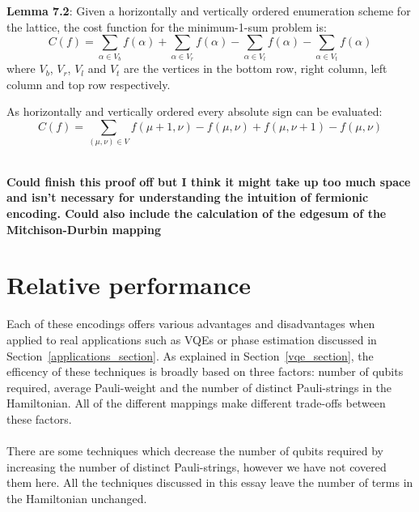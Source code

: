 \documentclass[twoside]{article}
\begin{document}
\begin{itemlist}
\begin{alphlist}
               \end{alphlist}
       \item \textbf{Lemma 7.2}: Given a horizontally and vertically ordered enumeration scheme for the lattice, the cost function for the minimum-1-sum problem is:
               \begin{equation}
                       C(f) = \sum_{\alpha\in V_b} f(\alpha) + \sum_{\alpha\in V_r} f(\alpha) - \sum_{\alpha\in V_l} f(\alpha) - \sum_{\alpha\in V_t} f(\alpha) 
               \end{equation}
               where $V_b$, $V_r$, $V_l$ and $V_t$ are the vertices in the bottom row, right column, left column and top row respectively.
               \begin{alphlist}
               \item As horizontally and vertically ordered every absolute sign can be evaluated:
                       \begin{equation}
                               C(f) = \sum_{(\mu, \nu) \in V} f(\mu+1, \nu) - f(\mu, \nu) + f(\mu, \nu+1) - f(\mu, \nu)
                       \end{equation}\\
               \end{alphlist}
               \end{itemlist}
               \textbf{Could finish this proof off but I think it might take up too much space and isn't necessary for understanding the intuition of fermionic encoding. Could also include the calculation of the edgesum of the Mitchison-Durbin mapping}
   \section{Relative performance}\label{comparision_section}
   Each of these encodings offers various advantages and disadvantages when applied to real applications such as VQEs or phase estimation discussed in Section~\ref{applications_section}. As explained in Section~\ref{vqe_section}, the efficency of these techniques is broadly based on three factors: number of qubits required, average Pauli-weight and the number of distinct Pauli-strings in the Hamiltonian. All of the different mappings make different trade-offs between these factors.\\\\
   There are some techniques \cite{reducequbits} which decrease the number of qubits required by increasing the number of distinct Pauli-strings, however we have not covered them here. All the techniques discussed in this essay leave the number of terms in the Hamiltonian unchanged.
\end{document}
